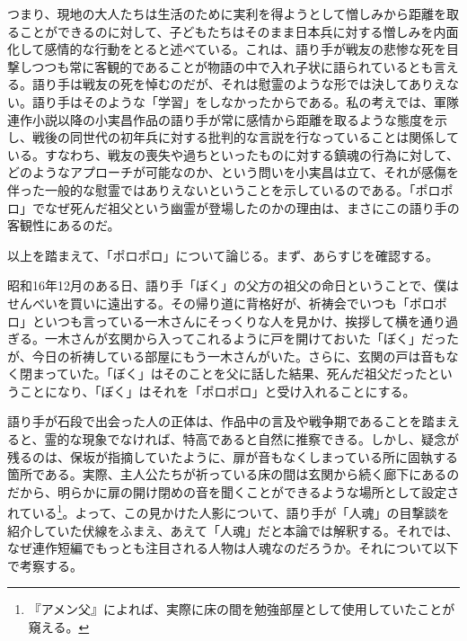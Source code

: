 つまり、現地の大人たちは生活のために実利を得ようとして憎しみから距離を取ることができるのに対して、子どもたちはそのまま日本兵に対する憎しみを内面化して感情的な行動をとると述べている。これは、語り手が戦友の悲惨な死を目撃しつつも常に客観的であることが物語の中で入れ子状に語られているとも言える。語り手は戦友の死を悼むのだが、それは慰霊のような形では決してありえない。語り手はそのような「学習」をしなかったからである。私の考えでは、軍隊連作小説以降の小実昌作品の語り手が常に感情から距離を取るような態度を示し、戦後の同世代の初年兵に対する批判的な言説を行なっていることは関係している。すなわち、戦友の喪失や過ちといったものに対する鎮魂の行為に対して、どのようなアプローチが可能なのか、という問いを小実昌は立て、それが感傷を伴った一般的な慰霊ではありえないということを示しているのである。「ポロポロ」でなぜ死んだ祖父という幽霊が登場したのかの理由は、まさにこの語り手の客観性にあるのだ。

以上を踏まえて、「ポロポロ」について論じる。まず、あらすじを確認する。

昭和16年12月のある日、語り手「ぼく」の父方の祖父の命日ということで、僕はせんべいを買いに遠出する。その帰り道に背格好が、祈祷会でいつも「ポロポロ」といつも言っている一木さんにそっくりな人を見かけ、挨拶して横を通り過ぎる。一木さんが玄関から入ってこれるように戸を開けておいた「ぼく」だったが、今日の祈祷している部屋にもう一木さんがいた。さらに、玄関の戸は音もなく閉まっていた。「ぼく」はそのことを父に話した結果、死んだ祖父だったということになり、「ぼく」はそれを「ポロポロ」と受け入れることにする。

語り手が石段で出会った人の正体は、作品中の言及や戦争期であることを踏まえると、霊的な現象でなければ、特高であると自然に推察できる。しかし、疑念が残るのは、保坂が指摘していたように、扉が音もなくしまっている所に固執する箇所である。実際、主人公たちが祈っている床の間は玄関から続く廊下にあるのだから、明らかに扉の開け閉めの音を聞くことができるような場所として設定されている\footnote{『アメン父』によれば、実際に床の間を勉強部屋として使用していたことが窺える。}。よって、この見かけた人影について、語り手が「人魂」の目撃談を紹介していた伏線をふまえ、あえて「人魂」だと本論では解釈する。それでは、なぜ連作短編でもっとも注目される人物は人魂なのだろうか。それについて以下で考察する。

